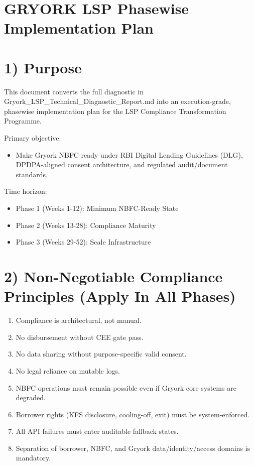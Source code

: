 ﻿\documentclass[12pt]{article}
\begin{document}
\section*{GRYORK LSP Phasewise Implementation Plan}


\section{1) Purpose}


This document converts the full diagnostic in Gryork\_LSP\_Technical\_Diagnostic\_Report.md into an execution-grade, phasewise implementation plan for the LSP Compliance Transformation Programme.


Primary objective:

\begin{itemize}
\item Make Gryork NBFC-ready under RBI Digital Lending Guidelines (DLG), DPDPA-aligned consent architecture, and regulated audit/document standards.
\end{itemize}

Time horizon:

\begin{itemize}
\item Phase 1 (Weeks 1-12): Minimum NBFC-Ready State
\item Phase 2 (Weeks 13-28): Compliance Maturity
\item Phase 3 (Weeks 29-52): Scale Infrastructure
\end{itemize}

\section{2) Non-Negotiable Compliance Principles (Apply In All Phases)}


\begin{enumerate}
\item Compliance is architectural, not manual.
\item No disbursement without CEE gate pass.
\item No data sharing without purpose-specific valid consent.
\item No legal reliance on mutable logs.
\item NBFC operations must remain possible even if Gryork core systems are degraded.
\item Borrower rights (KFS disclosure, cooling-off, exit) must be system-enforced.
\item All API failures must enter auditable fallback states.
\item Separation of borrower, NBFC, and Gryork data/identity/access domains is mandatory.
\end{enumerate}
\end{document}

